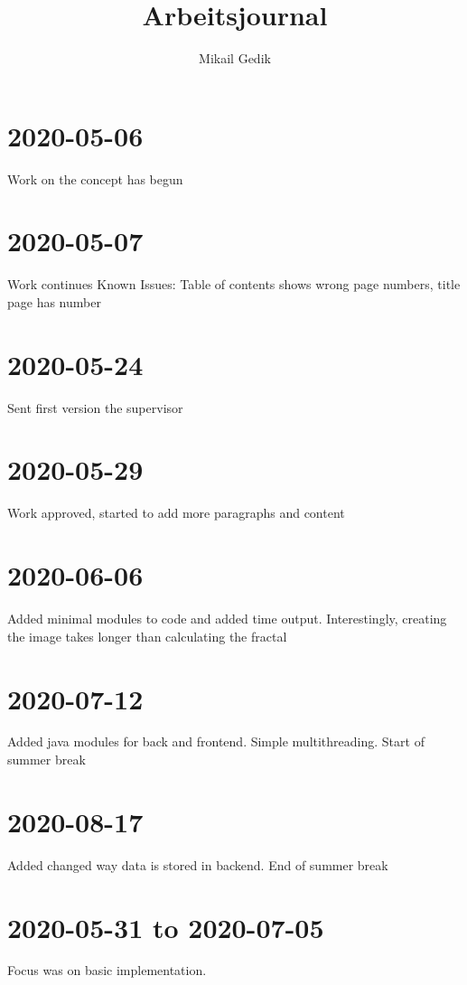 \documentclass[10pt,a4paper]{article}
\author{Mikail Gedik}
\title{Arbeitsjournal}
\begin{document}
	\maketitle
	\section{2020-05-06}
	Work on the concept has begun
	\section{2020-05-07}
	Work continues\newline
	Known Issues: Table of contents shows wrong page numbers, title page has number
	\section{2020-05-24}
	Sent first version the supervisor
	\section{2020-05-29}
	Work approved, started to add more paragraphs and content
	\section{2020-06-06}
	Added minimal modules to code and added time output. Interestingly, creating the image takes longer than calculating the fractal
	\section{2020-07-12}
	Added java modules for back and frontend. Simple multithreading. Start of summer break
	\section{2020-08-17}
	Added changed way data is stored in backend. End of summer break
	
	\section{2020-05-31 to 2020-07-05}
	Focus was on basic implementation.
	
\end{document}

